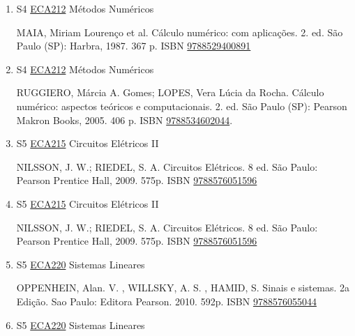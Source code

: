 \documentclass[12pt,a4paper]{book}
\begin{document}
\begin{enumerate}
 
 \item S4 \hyperref[PUD:ECA212]{ECA212} Métodos Numéricos

 MAIA, Miriam Lourenço et al.  Cálculo numérico: com aplicações.  2. ed.  São Paulo (SP): Harbra, 1987.  367 p.  ISBN \href{http://www.bn.br/site/pages/servicosProfissionais/agenciaISBN/isbnBusca/FbnBuscaISBNCatalogo.asp?pField=ISBN&pIntPagina=1&pISBN=29400891&nidbISBN=true&hidbISBN=true}{9788529400891}
 
 
 \item S4 \hyperref[PUD:ECA212]{ECA212} Métodos Numéricos

 RUGGIERO, Márcia A.  Gomes;  LOPES, Vera Lúcia da Rocha.  Cálculo numérico: aspectos teóricos e computacionais.  2. ed.  São Paulo (SP): Pearson Makron Books, 2005.  406 p.  ISBN \href{http://www.bn.br/site/pages/servicosProfissionais/agenciaISBN/isbnBusca/FbnBuscaISBNCatalogo.asp?pField=ISBN&pIntPagina=1&pISBN=34602044&nidbISBN=true&hidbISBN=true}{9788534602044}.
 \item S5 \hyperref[PUD:ECA215]{ECA215} Circuitos Elétricos II

 NILSSON, J.  W.;  RIEDEL, S.  A.  Circuitos Elétricos.  8 ed.  São Paulo: Pearson 
Prentice Hall, 2009.  575p.  ISBN \href{http://www.bn.br/site/pages/servicosProfissionais/agenciaISBN/isbnBusca/FbnBuscaISBNCatalogo.asp?pField=ISBN&pIntPagina=1&pISBN=76051596&nidbISBN=true&hidbISBN=true}{9788576051596}
 
 
 \item S5 \hyperref[PUD:ECA215]{ECA215} Circuitos Elétricos II

 NILSSON, J.  W.;  RIEDEL, S.  A.  Circuitos Elétricos.  8 ed.  São Paulo: Pearson 
Prentice Hall, 2009.  575p.  ISBN \href{http://www.bn.br/site/pages/servicosProfissionais/agenciaISBN/isbnBusca/FbnBuscaISBNCatalogo.asp?pField=ISBN&pIntPagina=1&pISBN=76051596&nidbISBN=true&hidbISBN=true}{9788576051596}
 
 
 \item S5 \hyperref[PUD:ECA220]{ECA220} Sistemas Lineares

 OPPENHEIN, Alan.  V. , WILLSKY, A. S. , HAMID, S.  Sinais e sistemas.  2a Edição.  Sao Paulo: Editora Pearson.  2010.  592p.  ISBN \href{http://www.bn.br/site/pages/servicosProfissionais/agenciaISBN/isbnBusca/FbnBuscaISBNCatalogo.asp?pField=ISBN&pIntPagina=1&pISBN=76055044&nidbISBN=true&hidbISBN=true}{9788576055044}
 
 
 \item S5 \hyperref[PUD:ECA220]{ECA220} Sistemas Lineares


\end{enumerate}
\end{document}
